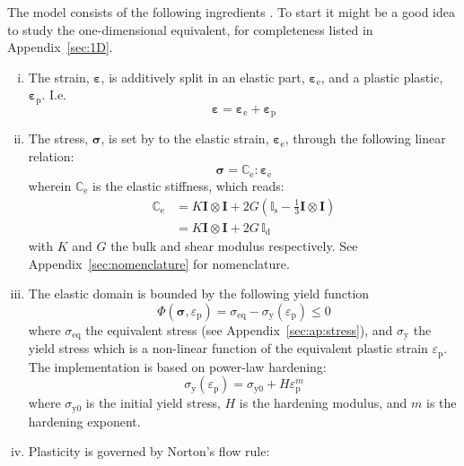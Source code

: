 \documentclass[times,namecite]{goose-article}
\begin{document}
The model consists of the following ingredients \citep[][Chapter 11]{DeSouzaNeto2008}. To start it might be a good idea to study the one-dimensional equivalent, for completeness listed in Appendix~\ref{sec:1D}.
%
\begin{enumerate}[(i)]
%
\item The strain, $\bm{\varepsilon}$, is additively split in an elastic part, $\bm{\varepsilon}_\mathrm{e}$, and a plastic plastic, $\bm{\varepsilon}_\mathrm{p}$. I.e.
\begin{equation}
  \bm{\varepsilon} = \bm{\varepsilon}_\mathrm{e} + \bm{\varepsilon}_\mathrm{p}
\end{equation}
%
\item The stress, $\bm{\sigma}$, is set by to the elastic strain, $\bm{\varepsilon}_\mathrm{e}$, through the following linear relation:
\begin{equation}\label{eq:model:stress-elas}
  \bm{\sigma} = \mathbb{C}_\mathrm{e} : \bm{\varepsilon}_\mathrm{e}
\end{equation}
wherein $\mathbb{C}_\mathrm{e}$ is the elastic stiffness, which reads:
\begin{align}\label{eq:model:elas}
  \mathbb{C}_\mathrm{e}
  &= K \bm{I} \otimes \bm{I} + 2 G (  \mathbb{I}_\mathrm{s} - \tfrac{1}{3} \bm{I} \otimes \bm{I} )
  \\
  &= K \bm{I} \otimes \bm{I} + 2 G \, \mathbb{I}_\mathrm{d}
\end{align}
with $K$ and $G$ the bulk and shear modulus respectively. See Appendix~\ref{sec:nomenclature} for nomenclature.
%
\item The elastic domain is bounded by the following yield function
\begin{equation}
  \Phi( \bm{\sigma} , \varepsilon_\mathrm{p} )
  =
  \sigma_\mathrm{eq} - \sigma_\mathrm{y} (\varepsilon_\mathrm{p}) \leq 0
\end{equation}
where $\sigma_\mathrm{eq}$ the equivalent stress (see Appendix~\ref{sec:ap:stress}), and $\sigma_\mathrm{y}$ the yield stress which is a non-linear function of the equivalent plastic strain $\varepsilon_\mathrm{p}$. The implementation is based on power-law hardening:
\begin{equation}
  \sigma_\mathrm{y} ( \varepsilon_\mathrm{p} ) = \sigma_\mathrm{y0} + H \varepsilon_\mathrm{p}^m
\end{equation}
where $\sigma_\mathrm{y0}$ is the initial yield stress, $H$ is the hardening modulus, and $m$ is the hardening exponent.
%
\item Plasticity is governed by Norton's flow rule:

\end{enumerate}
\end{document}
